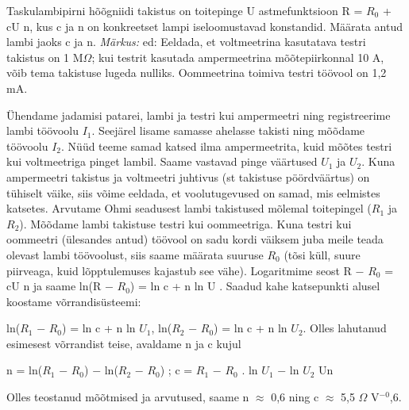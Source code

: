 
Taskulambipirni hõõgniidi takistus on toitepinge U astmefunktsioon R = $R_0$ + cU n, kus c ja n on konkreetset lampi iseloomustavad konstandid. Määrata antud lambi jaoks c ja n.
\textit{Märkus:} ed: Eeldada, et voltmeetrina kasutatava testri takistus on 1 M$\Omega$; kui testrit kasutada ampermeetrina mõõtepiirkonnal 10 A, võib tema takistuse lugeda nulliks. Oommeetrina toimiva testri töövool on 1,2 mA.

\hint

\solu
Ühendame jadamisi patarei, lambi ja testri kui ampermeetri ning registreerime lambi töövoolu $I_1$. Seejärel lisame samasse ahelasse takisti ning mõõdame töövoolu $I_2$. Nüüd teeme samad katsed ilma ampermeetrita, kuid mõõtes testri kui voltmeetriga pinget lambil. Saame vastavad pinge väärtused $U_1$ ja $U_2$. Kuna ampermeetri takistus ja voltmeetri juhtivus (st takistuse pöördväärtus) on tühiselt väike, siis võime eeldada, et voolutugevused on samad, mis eelmistes katsetes. Arvutame Ohmi seadusest lambi takistused mõlemal toitepingel ($R_1$ ja $R_2$). Mõõdame lambi takistuse testri kui oommeetriga. Kuna testri kui oommeetri (ülesandes antud) töövool on sadu kordi väiksem juba meile teada olevast lambi töövoolust, siis saame määrata suuruse $R_0$ (tõsi küll, suure piirveaga, kuid lõpptulemuses kajastub see vähe). Logaritmime seost R $-$ $R_0$ = cU n ja saame ln(R $-$ $R_0$) = ln c + n ln U . Saadud kahe katsepunkti alusel koostame võrrandisüsteemi:

ln($R_1$ $-$ $R_0$) = ln c + n ln $U_1$, ln($R_2$ $-$ $R_0$) = ln c + n ln $U_2$. Olles lahutanud esimesest võrrandist teise, avaldame n ja c kujul

n = ln($R_1$ $-$ $R_0$) $-$ ln($R_2$ $-$ $R_0$) ; c = $R_1$ $-$ $R_0$ . ln $U_1$ $-$ ln $U_2$ Un

Olles teostanud mõõtmised ja arvutused, saame n $\approx$ 0,6 ning c $\approx$ 5,5 $\Omega$ V$^{-0}$,6.
\probend
